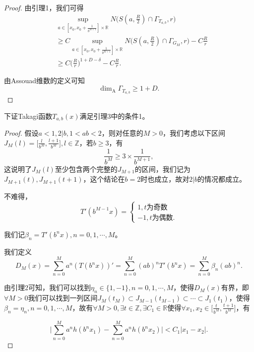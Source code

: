\begin{proof}
            由引理1，我们可得
            $$
                  \begin{aligned}
                        &\sup\limits_{a\in[x_0,x_0+\frac{1}{b^{M+1}}]\times\mathbb{R}}N\big(S(a,\frac{R}{2})\cap\Gamma_{T_{a,b}},r\big)\\
                              &\ge C\sup\limits_{a\in[x_0,x_0+\frac{1}{b^{M+1}}]\times\mathbb{R}}N\big(S(a,\frac{R}{2})\cap\Gamma_{G_M},r\big)-C\frac{R}{r}\\
                              &\ge C\big(\frac{R}{r}\big)^{1+D-\delta}-C\frac{R}{r}.
                  \end{aligned}
            $$

            由Assouad维数的定义可知
            $$
                  \mathrm{\dim_A}\Gamma_{T_{a,b}}\ge1+D.
            $$
\end{proof}

下证Takagi函数$T_{a,b}(x)$满足引理3中的条件1。


\begin{proof}
      假设$a<1,2|b,1<ab<2$，则对任意的$M>0$，我们考虑以下区间$J_M(l)=\big[\frac{l}{b^M},\frac{l+1}{b^M}\big],l\in\mathbb{Z}$，若$b\ge3$，有
      $$
            \frac{1}{b^M}\ge3\times\frac{1}{b^{M+1}},
      $$
      这说明了$J_M(l)$至少包含两个完整的$J_{M+1}$的区间，我们记为$J_{M+1}(t),J_{M+1}(t+1)$，这个结论在$b=2$时也成立，故对$2|b$的情况都成立。

      不难得，
      $$
      T'(b^{M-1}x)=\begin{cases}
            1,t\mbox{为奇数}\\
            -1,t\mbox{为偶数}.
      \end{cases}
      $$

      我们记$\beta_n=T'(b^nx),n=0,1,\cdots,M$。

      我们定义
      $$
      D_M(x)=\sum_{n=0}^Ma^n(T(b^nx))'=\sum_{n=0}^M(ab)^nT'(b^nx)=\sum_{n=0}^M\beta_n(ab)^n.
      $$

      由引理2可知，我们可以找到$\eta_n\in\{1,-1\},n=0,1,\cdots,M$，使得$D_M(x)$有界，即$\forall M>0$我们可以找到一列区间$J_M(t_M)\subset J_{M-1}(t_{M-1})\subset\cdots\subset J_1(t_1)$，使得$\beta_n=\eta_n,n=0,1,\cdots,M$，故有$\forall M>0,\exists t\in\mathbb{Z},\exists C_1\in\mathbb{R}$使得$\forall x_1,x_2\in \big[\frac{t}{b^M},\frac{t+1}{b^M}\big]$，有

      $$
      \Big|\sum_{n=0}^Ma^nh(b^nx_1)-\sum_{n=0}^Ma^nh(b^nx_2)\Big|<C_1|x_1-x_2|.
      $$
\end{proof}

